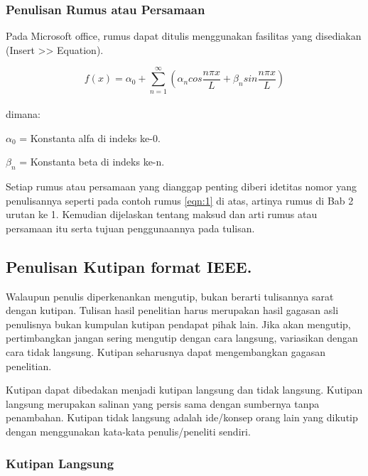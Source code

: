 \documentclass{final_project}
\begin{document}
\vspace{20mm}
\subsubsection{Penulisan Rumus atau Persamaan}

Pada Microsoft office, rumus dapat ditulis menggunakan fasilitas yang disediakan (Insert >> Equation).

\begin{equation}\label{eqn:1}
    f(x)=\alpha_{0}+\sum_{n=1}^{\infty}(\alpha_{n}cos{\frac{{n}\pi{x}}{L}}+\beta_{n}sin{\frac{{n}\pi{x}}{L}})
\end{equation}\\
dimana:

	$\alpha_{0}$ = Konstanta alfa di indeks ke-0.
	
	$\beta_{n}$ = Konstanta beta di indeks ke-n.
	
Setiap rumus atau persamaan yang dianggap penting diberi idetitas nomor yang penulisannya seperti pada contoh rumus 
\eqref{eqn:1} di atas, artinya rumus di Bab 2 urutan ke 1. Kemudian dijelaskan tentang maksud dan arti rumus atau persamaan itu serta tujuan penggunaannya pada tulisan.

\subsection{Penulisan Kutipan format IEEE.}

Walaupun penulis diperkenankan mengutip, bukan berarti tulisannya sarat dengan kutipan. Tulisan hasil penelitian harus merupakan hasil gagasan asli penulisnya bukan kumpulan kutipan pendapat pihak lain. Jika akan mengutip, pertimbangkan jangan sering mengutip dengan cara langsung, variasikan dengan cara tidak langsung. Kutipan seharusnya dapat mengembangkan gagasan penelitian.

Kutipan dapat dibedakan menjadi kutipan langsung dan tidak langsung. Kutipan langsung merupakan salinan yang persis sama dengan sumbernya tanpa penambahan. Kutipan tidak langsung adalah ide/konsep orang lain yang dikutip dengan menggunakan kata-kata penulis/peneliti sendiri.

\subsubsection{Kutipan Langsung}
\end{document}
